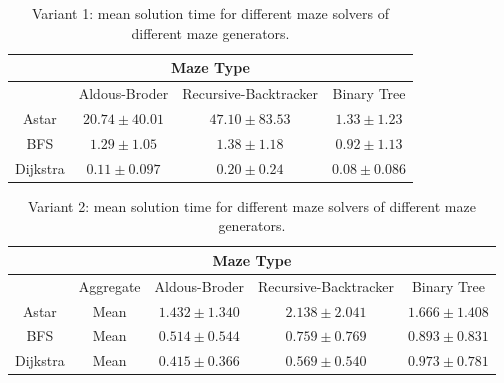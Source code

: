 \begin{table}[!h]
    \begin{center} 
        \caption{Variant 1: mean solution time for different maze solvers of different maze generators.} 
    \begin{tabular}{ c c c c} 
    \multicolumn{4}{c}{Maze Type} \\
    \hline
    &Aldous-Broder&Recursive-Backtracker&Binary Tree\\
    \hline
    Astar&$20.74\pm 40.01$&$47.10\pm 83.53 $&$1.33\pm 1.23$\\
    \hline
    BFS&$1.29\pm 1.05$&$1.38\pm 1.18$&$0.92\pm 1.13$\\
    \hline
    Dijkstra&$0.11\pm 0.097$&$0.20\pm 0.24$&$0.08\pm 0.086$\\  
    \hline
     \end{tabular} 
    \end{center}
     \end{table}
     \begin{table}[!h]
        \begin{center} 
            \caption{Variant 2: mean solution time for different maze solvers of different maze generators.} 
        \begin{tabular}{ c c c c c} 
        \multicolumn{5}{c}{Maze Type} \\
        \hline
        &Aggregate&Aldous-Broder&Recursive-Backtracker&Binary Tree\\
        \hline
        Astar&Mean&$1.432\pm 1.340$&$2.138\pm 2.041$&$1.666\pm 1.408$\\
        \hline
        BFS&Mean&$0.514\pm 0.544$&$0.759\pm 0.769$&$0.893\pm 0.831$\\
        \hline
        Dijkstra&Mean&$0.415\pm 0.366$&$0.569\pm 0.540$&$0.973\pm 0.781$\\  
        \hline
         \end{tabular} 
        \end{center}
         \end{table}
\newpage
